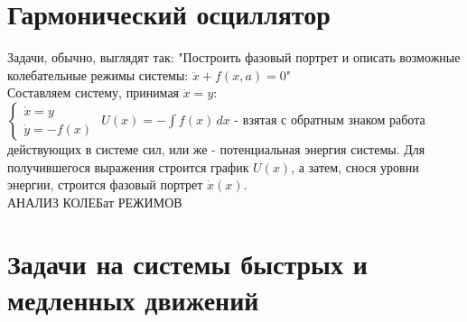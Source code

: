 \newcommand{\colontitulAutors}{astronom\_v\_cube, edombek et al.}
\newcommand{\colontitulYear}{2022}
\newcommand{\colontitulEducationalSubject}{Алгоритмы решения задач по теории колебаний}
\newcommand{\colontitulTeacher}{LaTex}




	\small
	\begin{multicols*}{2}

		\section{Гармонический осциллятор}

		Задачи, обычно, выглядят так:
		"Построить фазовый портрет и описать возможные колебательные режимы системы: $ \ddot{x} + f(x, a) = 0 $"\\
		Составляем систему, принимая $\dot{x} = y$:\\
		$\begin{cases}
			\dot{x} = y \\
			\dot{y} = -f(x)
		\end{cases} $
		$U(x) = -\int f(x) \,dx $ - взятая с обратным знаком работа действующих в системе сил, или же - потенциальная энергия системы. Для  получившегося выражения строится график $U(x)$, а затем, снося уровни энергии, строится фазовый портрет $\dot{x}(x)$.\\
		АНАЛИЗ КОЛЕБат РЕЖИМОВ


		\section{Задачи на системы быстрых и медленных движений}


	\end{multicols*}
